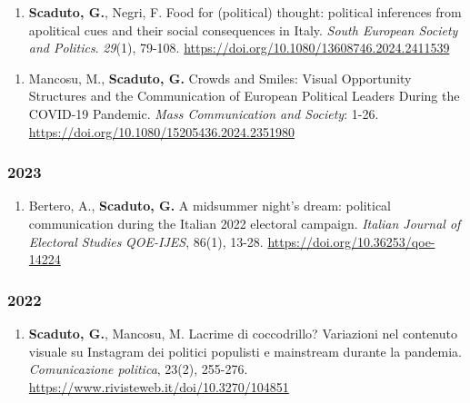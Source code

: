 \documentclass[10pt,]{article}
\providecommand{\tightlist}{%
  \setlength{\itemsep}{0pt}\setlength{\parskip}{0pt}}
\begin{document}
\begin{enumerate}
\def\labelenumi{\arabic{enumi}.}
\setcounter{enumi}{4}
\tightlist
\item
  \textbf{Scaduto, G.}, Negri, F. Food for (political) thought:
  political inferences from apolitical cues and their social
  consequences in Italy. \emph{South European Society and Politics}.
  \emph{29}(1), 79-108.
  \url{https://doi.org/10.1080/13608746.2024.2411539}
\end{enumerate}

\begin{enumerate}
\def\labelenumi{\arabic{enumi}.}
\setcounter{enumi}{3}
\tightlist
\item
  Mancosu, M., \textbf{Scaduto, G.} Crowds and Smiles: Visual
  Opportunity Structures and the Communication of European Political
  Leaders During the COVID-19 Pandemic. \emph{Mass Communication and
  Society}: 1-26. \url{https://doi.org/10.1080/15205436.2024.2351980}
\end{enumerate}

\subsubsection{2023}\label{section-2}

\begin{enumerate}
\def\labelenumi{\arabic{enumi}.}
\setcounter{enumi}{2}
\tightlist
\item
  Bertero, A., \textbf{Scaduto, G.} A midsummer night's dream: political
  communication during the Italian 2022 electoral campaign.
  \emph{Italian Journal of Electoral Studies} \emph{QOE-IJES}, 86(1),
  13-28. \url{https://doi.org/10.36253/qoe-14224}
\end{enumerate}

\subsubsection{2022}\label{section-3}

\begin{enumerate}
\def\labelenumi{\arabic{enumi}.}
\setcounter{enumi}{1}
\tightlist
\item
  \textbf{Scaduto, G.}, Mancosu, M. Lacrime di coccodrillo? Variazioni
  nel contenuto visuale su Instagram dei politici populisti e mainstream
  durante la pandemia. \emph{Comunicazione politica}, 23(2), 255-276.
  \url{https://www.rivisteweb.it/doi/10.3270/104851}
\end{enumerate}
\end{document}
